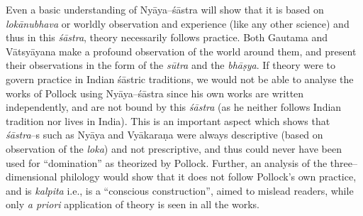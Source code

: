 Even a basic understanding of Nyāya–śāstra will show that it is based on \textit{lokānubhava} or worldly observation and experience (like any other science) and thus in this \textit{śāstra}, theory necessarily follows practice. Both Gautama and Vātsyāyana make a profound observation of the world around them, and present their observations in the form of the \textit{sūtra} and the\textit{ bhāṣya}. If theory were to govern practice in Indian śāstric traditions, we would not be able to analyse the works of Pollock using Nyāya–śāstra since his own works are written independently, and are not bound by this \textit{śāstra }(as he neither follows Indian tradition nor lives in India). This is an important aspect which shows that \textit{śāstra}–s such as Nyāya and Vyākaraṇa were always descriptive (based on observation of the \textit{loka}) and not prescriptive, and thus could never have been used for “domination” as theorized by Pollock. Further, an analysis of the three–dimensional philology would show that it does not follow Pollock’s own practice, and is \textit{kalpita} i.e., is a “conscious construction”, aimed to mislead readers, while only \textit{a priori} application of theory is seen in all the works.

